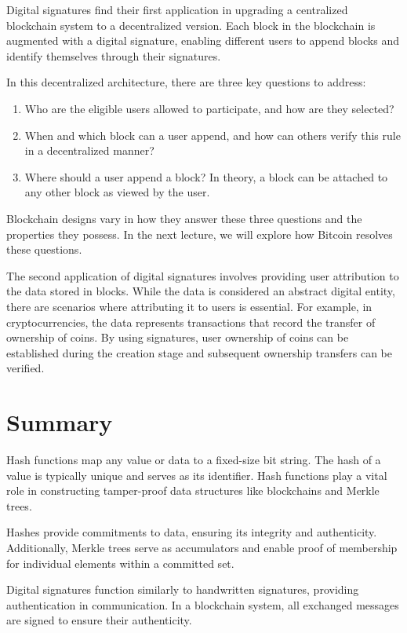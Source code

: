 \documentclass{report}
\begin{document}
Digital signatures find their first application in upgrading a centralized blockchain system to a decentralized version. Each block in the blockchain is augmented with a digital signature, enabling different users to append blocks and identify themselves through their signatures.

In this decentralized architecture, there are three key questions to address:
\begin{enumerate}
	\item { Who are the eligible users allowed to participate, and how are they selected?}
	\item {When and which block can a user append, and how can others verify this rule in a decentralized manner?}
	\item {Where should a user append a block? In theory, a block can be attached to any other block as viewed by the user.}
\end{enumerate} 


Blockchain designs vary in how they answer these three questions and the properties they possess. In the next lecture, we will explore how Bitcoin resolves these questions.

The second application of digital signatures involves providing user attribution to the data stored in blocks. While the data is considered an abstract digital entity, there are scenarios where attributing it to users is essential. For example, in cryptocurrencies, the data represents transactions that record the transfer of ownership of coins. By using signatures, user ownership of coins can be established during the creation stage and subsequent ownership transfers can be verified.

\section{Summary}
Hash functions map any value or data to a fixed-size bit string. The hash of a value is typically unique and serves as its identifier. Hash functions play a vital role in constructing tamper-proof data structures like blockchains and Merkle trees.

Hashes provide commitments to data, ensuring its integrity and authenticity. Additionally, Merkle trees serve as accumulators and enable proof of membership for individual elements within a committed set.

Digital signatures function similarly to handwritten signatures, providing authentication in communication. In a blockchain system, all exchanged messages are signed to ensure their authenticity.
\end{document}
